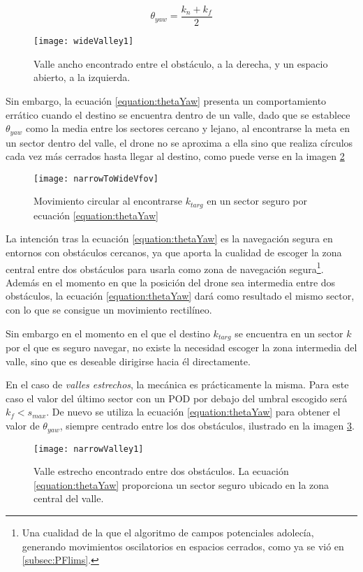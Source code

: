 \begin{equation}
\theta_{yaw} = \frac{k_n + k_f}{2}
\label{equation:thetaYaw}
\end{equation}


 \begin{figure}[H]
	\centering
	\texttt{[image: wideValley1]}
	\caption{Valle ancho encontrado entre el obstáculo, a la derecha, y un espacio abierto, a la izquierda.}\label{fig:wvalley1}
\end{figure}


Sin embargo, la ecuación \ref{equation:thetaYaw} presenta un comportamiento errático cuando el destino se encuentra dentro de un valle, dado que se establece $\theta_{yaw}$ como la media entre los sectores cercano y lejano, al encontrarse la meta en un sector dentro del valle, el drone no se aproxima a ella sino que realiza círculos cada vez más cerrados hasta llegar al destino, como puede verse en la imagen \ref{fig:nToWFOV}

 \begin{figure}[H]
	\centering
	\texttt{[image: narrowToWideVfov]}
	\caption{Movimiento circular al encontrarse $k_{targ}$ en un sector seguro por ecuación \ref{equation:thetaYaw}}\label{fig:nToWFOV}
\end{figure}

La intención tras la ecuación \ref{equation:thetaYaw} es la navegación segura en entornos con obstáculos cercanos, ya que aporta la cualidad de escoger la zona central entre dos obstáculos para usarla como zona de navegación segura\footnote{Una cualidad de la que el algoritmo de campos potenciales adolecía, generando movimientos oscilatorios en espacios cerrados, como ya se vió en \ref{subsec:PFlims}.}. Además en el momento en que la posición del drone sea intermedia entre dos obstáculos, la ecuación \ref{equation:thetaYaw} dará como resultado el mismo sector, con lo que se consigue un movimiento rectilíneo. 

Sin embargo en el momento en el que el destino $k_{targ}$ se encuentra en un sector $k$ por el que es seguro navegar, no existe la necesidad escoger la zona intermedia del valle, sino que es deseable dirigirse hacia él directamente. 

En el caso de \textit{valles estrechos}, la mecánica es prácticamente la misma. Para este caso el valor del último sector con un POD por debajo del umbral escogido será $k_f < s_{max}$. De nuevo se utiliza la ecuación \ref{equation:thetaYaw} para obtener el valor de $\theta_{yaw}$, siempre centrado entre los dos obstáculos, ilustrado en la imagen \ref{fig:nvalley1}.
 \begin{figure}[H]
	\centering
	\texttt{[image: narrowValley1]}
	\caption{Valle estrecho encontrado entre dos obstáculos. La ecuación \ref{equation:thetaYaw} proporciona un sector seguro ubicado en la zona central del valle.}\label{fig:nvalley1}
\end{figure}

